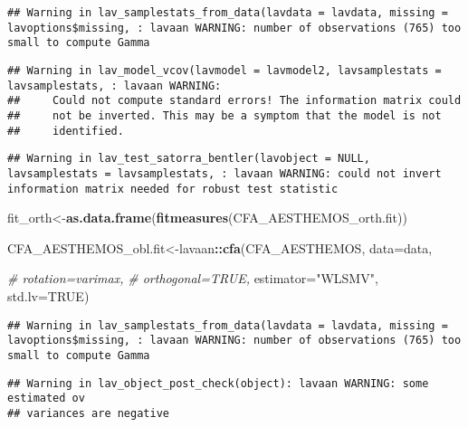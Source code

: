 \documentclass[
]{article}
\newenvironment{Shaded}{\begin{snugshade}}{\end{snugshade}}
\newcommand{\CommentTok}[1]{\textcolor[rgb]{0.56,0.35,0.01}{\textit{#1}}}
\newcommand{\DataTypeTok}[1]{\textcolor[rgb]{0.13,0.29,0.53}{#1}}
\newcommand{\KeywordTok}[1]{\textcolor[rgb]{0.13,0.29,0.53}{\textbf{#1}}}
\newcommand{\NormalTok}[1]{#1}
\newcommand{\OperatorTok}[1]{\textcolor[rgb]{0.81,0.36,0.00}{\textbf{#1}}}
\newcommand{\OtherTok}[1]{\textcolor[rgb]{0.56,0.35,0.01}{#1}}
\newcommand{\StringTok}[1]{\textcolor[rgb]{0.31,0.60,0.02}{#1}}
\begin{document}
\begin{verbatim}
## Warning in lav_samplestats_from_data(lavdata = lavdata, missing = lavoptions$missing, : lavaan WARNING: number of observations (765) too small to compute Gamma
\end{verbatim}

\begin{verbatim}
## Warning in lav_model_vcov(lavmodel = lavmodel2, lavsamplestats = lavsamplestats, : lavaan WARNING:
##     Could not compute standard errors! The information matrix could
##     not be inverted. This may be a symptom that the model is not
##     identified.
\end{verbatim}

\begin{verbatim}
## Warning in lav_test_satorra_bentler(lavobject = NULL, lavsamplestats = lavsamplestats, : lavaan WARNING: could not invert information matrix needed for robust test statistic
\end{verbatim}

\begin{Shaded}
\begin{Highlighting}[]
\NormalTok{fit\_orth\textless{}{-}}\KeywordTok{as.data.frame}\NormalTok{(}\KeywordTok{fitmeasures}\NormalTok{(CFA\_AESTHEMOS\_orth.fit))}


\NormalTok{CFA\_AESTHEMOS\_obl.fit\textless{}{-}lavaan}\OperatorTok{::}\KeywordTok{cfa}\NormalTok{(CFA\_AESTHEMOS,}
                         \DataTypeTok{data=}\NormalTok{data,}
                      
                     \CommentTok{\#  rotation=\textquotesingle{}varimax\textquotesingle{},}
                      \CommentTok{\#  orthogonal=TRUE, }
                         \DataTypeTok{estimator=}\StringTok{"WLSMV"}\NormalTok{, }
                         \DataTypeTok{std.lv=}\OtherTok{TRUE}\NormalTok{)}
\end{Highlighting}
\end{Shaded}

\begin{verbatim}
## Warning in lav_samplestats_from_data(lavdata = lavdata, missing = lavoptions$missing, : lavaan WARNING: number of observations (765) too small to compute Gamma
\end{verbatim}

\begin{verbatim}
## Warning in lav_object_post_check(object): lavaan WARNING: some estimated ov
## variances are negative
\end{verbatim}
\end{document}
